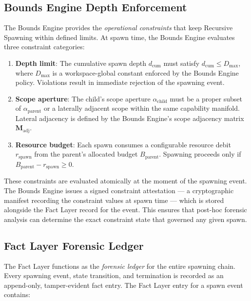 \subsection{Bounds Engine Depth Enforcement}
\label{sec:integration:bounds}

The Bounds Engine provides the \textit{operational constraints} that keep
Recursive Spawning within defined limits. At spawn time, the Bounds Engine
evaluates three constraint categories:

\begin{enumerate}
  \item \textbf{Depth limit}: The cumulative spawn depth $d_\text{cum}$
    must satisfy $d_\text{cum} \leq D_\text{max}$, where $D_\text{max}$
    is a workspace-global constant enforced by the Bounds Engine policy.
    Violations result in immediate rejection of the spawning event.
  \item \textbf{Scope aperture}: The child's scope aperture
    $\alpha_\text{child}$ must be a proper subset of $\alpha_\text{parent}$
    or a laterally adjacent scope within the same capability manifold.
    Lateral adjacency is defined by the Bounds Engine's scope adjacency
    matrix $\mathbf{M}_\text{adj}$.
  \item \textbf{Resource budget}: Each spawn consumes a configurable
    resource debit $r_\text{spawn}$ from the parent's allocated budget
    $B_\text{parent}$. Spawning proceeds only if
    $B_\text{parent} - r_\text{spawn} \geq 0$.
\end{enumerate}

These constraints are evaluated atomically at the moment of the spawning
event. The Bounds Engine issues a signed constraint attestation — a
cryptographic manifest recording the constraint values at spawn time —
which is stored alongside the Fact Layer record for the event. This
ensures that post-hoc forensic analysis can determine the exact constraint
state that governed any given spawn.

\subsection{Fact Layer Forensic Ledger}
\label{sec:integration:fact}

The Fact Layer functions as the \textit{forensic ledger} for the entire
spawning chain. Every spawning event, state transition, and termination
is recorded as an append-only, tamper-evident fact entry. The Fact Layer
entry for a spawn event contains:

